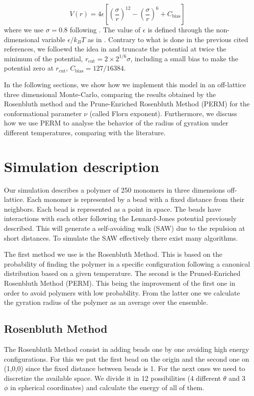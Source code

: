 \documentclass[aps,prl,reprint,groupedaddress]{revtex4-1}
\begin{document}
\begin{equation}
	V(r) = 4 \epsilon \left[\left(\frac{\sigma}{r} \right)^{12} - \left(\frac{\sigma}{r} \right)^{6} + C_{\text{bias}}\right]
\end{equation}
where we use $\sigma = 0.8$ following \cite{Yong1996, ICCPBook}. The value of $\epsilon$ is defined through the non-dimensional variable $\epsilon/k_B T$ as in \cite{Grassberger1997, Yong1996}. Contrary to what is done in the previous cited references, we folloewd the idea in \cite{mc_polymer_review} and truncate the potential at twice the minimum of the potential, $r_{\text{cut}} = 2 \times 2^{1/6} \sigma$, including a small bias to make the potential zero at $r_{\text{cut}}$, $C_{\text{bias}} = 127/16384$.

In the following sections, we show how we implement this model in an off-lattice three dimensional Monte-Carlo, comparing the results obtained by the Rosenbluth method and the Prune-Enriched Rosenbluth Method (PERM) for the conformational parameter $\nu$ (called Floru exponent). Furthermore, we discuss how we use PERM to analyse the behavior of the radius of gyration under different temperatures, comparing with the literature.

\section{Simulation description \label{description}}
Our simulation describes a polymer of 250 monomers in three dimensions off-lattice. Each monomer is represented by a bead with a fixed distance from their neighbors. Each bead is represented as a point in space. The beads have interactions with each other following the Lennard-Jones potential previously described. This will generate a self-avoiding walk (SAW) due to the repulsion at short distances. To simulate the SAW effectively there exist many algorithms. 

The first method we use is the Rosenbluth Method. This is based on the probability of finding the polymer in a specific configuration following a canonical distribution based on a given temperature.  The second is the Pruned-Enriched Rosenbluth Method (PERM). This being the improvement of the first one in order to avoid polymers with low probability. From the latter one we calculate the gyration radius of the polymer as an average over the ensemble.

\subsection{Rosenbluth Method}
The Rosenbluth Method consist in adding beads one by one avoiding high energy configurations. For this we put the first bead on the origin and the second one on (1,0,0) since the fixed distance between beads is 1. For the next ones we need to discretize the available space. We divide it in 12 possibilities (4 different $\theta$ and 3 $\phi$ in spherical coordinates) and calculate the energy of all of them. 
\end{document}
